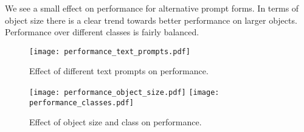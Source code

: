 \documentclass[10pt,twocolumn,letterpaper]{article}
\begin{document}
We see a small effect on performance for alternative prompt forms.
In terms of object size there is a clear trend towards better performance on larger objects.
Performance over different classes is fairly balanced.

\begin{figure}
    \centering
    \texttt{[image: performance\_text\_prompts.pdf]}
    \caption{Effect of different text prompts on performance.}
\label{fig:text_prompts}
\end{figure}

\begin{figure}
    \centering
    \texttt{[image: performance\_object\_size.pdf]}
    \texttt{[image: performance\_classes.pdf]}
    \caption{Effect of object size and class on performance.}
\label{fig:performance_analysis}
    
\end{figure}





 
\end{document}
